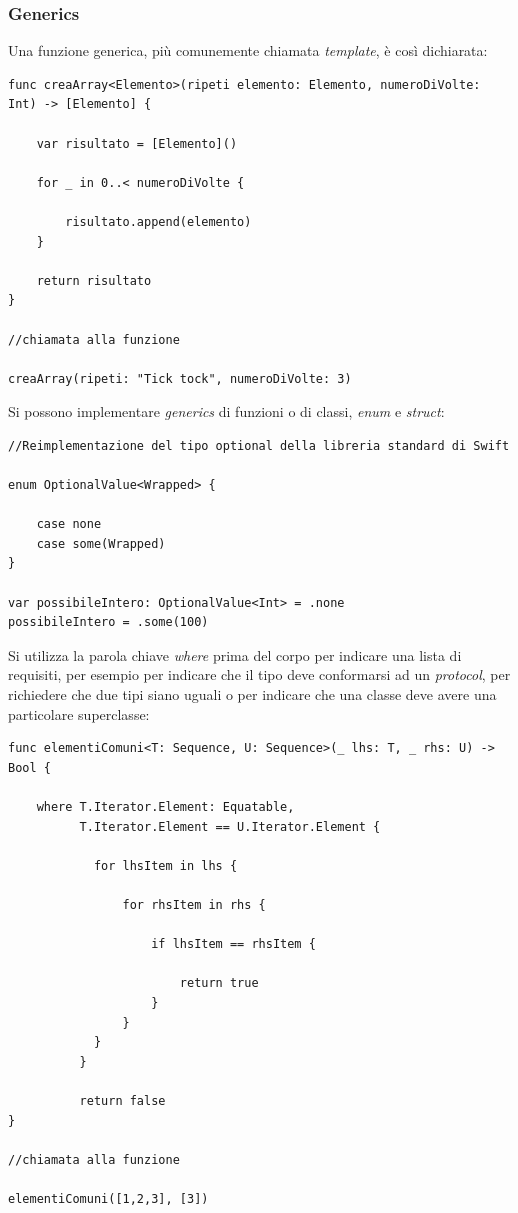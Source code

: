\subsubsection{Generics}
Una funzione generica, più comunemente chiamata \textit{template}, è così dichiarata:
\lstset{language=[Objective]C, breakindent=40pt, breaklines} 
\begin{lstlisting}
func creaArray<Elemento>(ripeti	elemento: Elemento, numeroDiVolte: Int) -> [Elemento] {

	var risultato = [Elemento]()
	
	for _ in 0..< numeroDiVolte {
		
		risultato.append(elemento)
	}
	
	return risultato
}

//chiamata alla funzione 

creaArray(ripeti: "Tick tock", numeroDiVolte: 3)
\end{lstlisting}
Si possono implementare \textit{generics} di funzioni o di classi, \textit{enum} e \textit{struct}:
\lstset{language=[Objective]C, breakindent=40pt, breaklines}
\begin{lstlisting}
//Reimplementazione del tipo optional della libreria standard di Swift

enum OptionalValue<Wrapped> {

	case none 
	case some(Wrapped)
}

var possibileIntero: OptionalValue<Int> = .none
possibileIntero = .some(100)
\end{lstlisting}
Si utilizza la parola chiave \textit{where} prima del corpo per indicare una lista di requisiti, per esempio per indicare che il tipo deve conformarsi ad un \textit{protocol}, per richiedere che due tipi siano uguali o per indicare che una classe deve avere una particolare superclasse: 
\lstset{language=[Objective]C, breakindent=40pt, breaklines}
\begin{lstlisting}
func elementiComuni<T: Sequence, U: Sequence>(_ lhs: T, _ rhs: U) -> Bool {
	
	where T.Iterator.Element: Equatable,
		  T.Iterator.Element == U.Iterator.Element {
		  
		  	for lhsItem in lhs {
		  	
		  		for rhsItem in rhs {
		  		
		  			if lhsItem == rhsItem {
		  				
		  				return true
		  			}
		  		}
		  	}
		  }
		  
		  return false
}

//chiamata alla funzione 

elementiComuni([1,2,3], [3])
\end{lstlisting}
